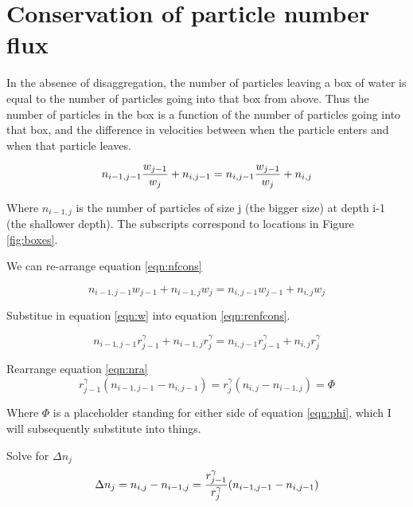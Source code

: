 \documentclass[a4paper,12pt]{article}
\begin{document}
\section{Conservation of particle number flux}

In the absence of disaggregation, the number of particles leaving a box of water is equal to the number of particles going into that box from above. Thus the number of particles in the box is a function of the number of particles going into that box, and the difference in velocities between when the particle enters and when that particle leaves.

\begin{equation}
n_{i-1, j-1}  {{w_{j-1}}\over{w_j}} + n_{i,j-1} = n_{i,j-1} {{w_{j-1}}\over{w_j}} + n_{i,j}
\label{eqn:nfcons}
\end{equation}

Where $n_{i-1,j}$ is the number of particles of size j (the bigger size) at depth i-1 (the shallower depth). The subscripts correspond to locations in Figure \ref{fig:boxes}.

We can re-arrange equation \ref{eqn:nfcons}

\begin{equation}
n_{i-1, j-1} w_{j-1} + n_{i-1,j} w_j = n_{i,j-1} w_{j-1} + n_{i,j} w_j
\label{eqn:renfcons}
\end{equation}


Substitue in equation \ref{eqn:w} into equation \ref{eqn:renfcons}.

\begin{equation}
n_{i-1, j-1} r^\gamma_{j-1} + n_{i-1,j} r^\gamma_j = n_{i,j-1} r^\gamma_{j-1} + n_{i,j} r^\gamma_j
\label{eqn:nra}
\end{equation}

Rearrange equation \ref{eqn:nra}
\begin{equation}
r^\gamma_{j-1} (n_{i-1, j-1} - n_{i, j-1} ) = r^\gamma_{j} (n_{i, j} - n_{i-1, j} ) = \Phi
\label{eqn:phi}
\end{equation}

Where $\Phi$ is a placeholder standing for either side of equation \ref{eqn:phi}, which I will subsequently substitute into things.

\medskip

Solve for $\Delta n_j$
 \begin{equation}
\Delta n_j = n_{i, j} - n_{i-1, j} = {{r^\gamma_{j-1}}\over{r^\gamma_{j}}} (n_{i-1,j-1}-n_{i,j-1})
 \end{equation}
\end{document}
